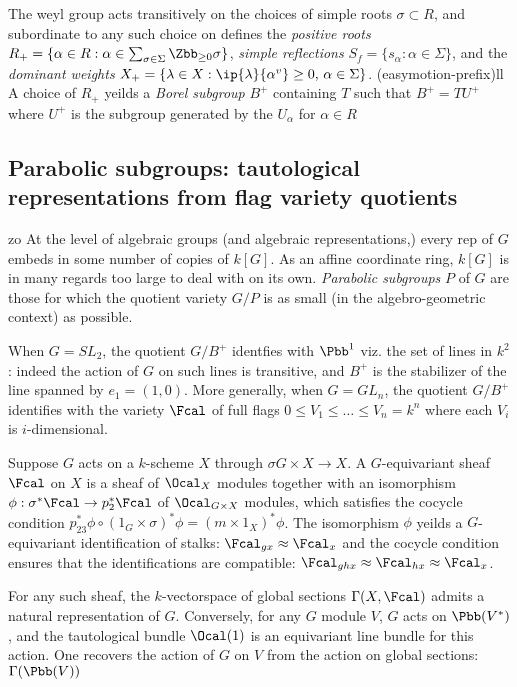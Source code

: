 \documentclass{amsart}
\begin{document}
The weyl group acts transitively on the choices of simple roots $\sigma \subset R$, and subordinate to any such choice on defines the \emph{positive roots}$R_+=\{\alpha \in R : \alpha \in \sum_{\sigma \in \Sigma} \Zbb_{\geq 0} \sigma \}$, \emph{simple reflections} $S_f = \{s_\alpha : \alpha \in \Sigma\}$, and the \emph{dominant weights} $X_+ = \{ \lambda \in X : \ip{\lambda}{\alpha^v}\geq 0, \, \alpha \in\Sigma \}$.
(easymotion-prefix)ll
A choice of $R_+$ yeilds a \emph{Borel subgroup} $B^+$ containing $T$ such that $B^+=TU^+$ where $U^+$ is the subgroup generated by the $U_\alpha$ for $\alpha \in R$

\subsection{Parabolic subgroups: tautological representations from flag variety quotients}zo
At the level of algebraic groups (and algebraic representations,) every rep of $G$ embeds in
some number of copies of $k[G]$. As an affine coordinate ring, $k[G]$ is in many regards too large to deal with on its own. \emph{Parabolic subgroups} $P$ of $G$ are those for which the quotient variety $G/P$ is as small (in the algebro-geometric context) as possible.

When $G=SL_2$, the quotient $G/B^+$ identfies with $\Pbb^1$ viz. the set of lines in $k^2$: indeed the action of $G$ on such lines is transitive, and $B^+$ is the stabilizer of the line spanned by $e_1 = (1,0)$. More generally, when $G=GL_n$, the quotient $G/B^+$ identifies with the variety $\Fcal$ of full flags $0 \leq V_1 \leq \ldots \leq V_n = k^n$ where each $V_i$ is $i$-dimensional.
\begin{definition}
  Suppose $G$ acts on a $k$-scheme $X$ through $\sigma G \times X \to X$. A $G$-equivariant sheaf $\Fcal$ on $X$ is a sheaf of $\Ocal_X$ modules together with an isomorphism $\phi: \sigma^* \Fcal \to p_2^* \Fcal$ of $\Ocal_{G\times X}$ modules, which satisfies the cocycle condition $p^*_{23}\phi \circ (1_G \times \sigma)^*\phi = (m \times 1_X )^*\phi$.  The isomorphism $\phi$ yeilds a $G$-equivariant identification of stalks: $\Fcal_{gx} \approx \Fcal_x$ and the cocycle condition ensures that the identifications are compatible: $\Fcal_{ghx} \approx \Fcal_{hx} \approx \Fcal_x$.
\end{definition}

For any such sheaf, the $k$-vectorspace of global sections $\Gamma(X,\Fcal)$ admits a natural representation of $G$. Conversely, for any $G$ module $V$, $G$ acts on $\Pbb(V^*)$, and the tautological bundle $\Ocal(1)$ is an equivariant line bundle for this action. One recovers the action of $G$ on $V$ from the action on global sections: $\Gamma(\Pbb(V))$
\end{document}
